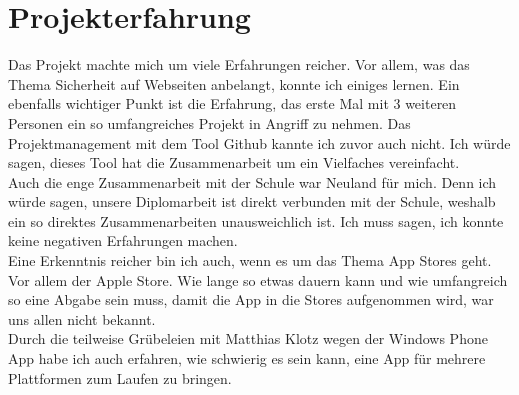 \section{Projekterfahrung}
Das Projekt machte mich um viele Erfahrungen reicher. Vor allem, was das Thema Sicherheit auf Webseiten anbelangt, konnte ich einiges lernen. Ein ebenfalls wichtiger Punkt ist die Erfahrung, das erste Mal mit 3 weiteren Personen ein so umfangreiches Projekt in Angriff zu nehmen. Das Projektmanagement mit dem Tool Github kannte ich zuvor auch nicht. Ich würde sagen, dieses Tool hat die Zusammenarbeit um ein Vielfaches vereinfacht.\\
Auch die enge Zusammenarbeit mit der Schule war Neuland für mich. Denn ich würde sagen, unsere Diplomarbeit ist direkt verbunden mit der Schule, weshalb ein so direktes Zusammenarbeiten unausweichlich ist. Ich muss sagen, ich konnte keine negativen Erfahrungen machen.\\
Eine Erkenntnis reicher bin ich auch, wenn es um das Thema App Stores geht. Vor allem der Apple Store. Wie lange so etwas dauern kann und wie umfangreich so eine Abgabe sein muss, damit die App in die Stores aufgenommen wird, war uns allen nicht bekannt.\\
Durch die teilweise Grübeleien mit Matthias Klotz wegen der Windows Phone App habe ich auch erfahren, wie schwierig es sein kann, eine App für mehrere Plattformen zum Laufen zu bringen. \\

